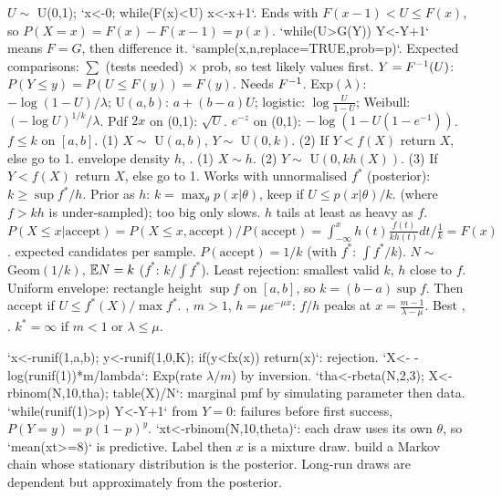 \sk{} $U\sim$ U(0,1); `x<-0; while(F(x)<U) x<-x+1`. Ends with $F(x-1)<U\le F(x)$, so $P(X=x)=F(x)-F(x-1)=p(x)$.  `while(U>G(Y)) Y<-Y+1` means $F=G$, then difference it. `sample(x,n,replace=TRUE,prob=p)`. Expected comparisons: $\sum$ (tests needed) $\times$ prob, so test likely values first.
\sk{} $Y=F^{-1}(U)$: $P(Y\le y)=P(U\le F(y))=F(y)$. Needs $F^{-1}$. Exp$(\lambda)$: $-\log(1-U)/\lambda$; U$(a,b)$: $a+(b-a)U$; logistic: $\log\frac U{1-U}$; Weibull: $(-\log U)^{1/k}/\lambda$. Pdf $2x$ on (0,1): $\sqrt U$. $e^{-z}$ on (0,1): $-\log(1-U(1-e^{-1}))$.
\sk{} $f\le k$ on $[a,b]$. (1) $X\sim$ U$(a,b)$, $Y\sim$ U$(0,k)$. (2) If $Y<f(X)$ return $X$, else go to 1.
\sk{} envelope density $h$, . (1) $X\sim h$. (2) $Y\sim$ U$(0,kh(X))$. (3) If $Y<f(X)$ return $X$, else go to 1. Works with unnormalised $f^*$ (posterior): $k\ge\sup f^*/h$. Prior as $h$: $k=\max_\theta p(x|\theta)$, keep if $U\le p(x|\theta)/k$.  (where $f>kh$ is under-sampled); too big only slows. $h$ tails at least as heavy as $f$.
\sk{} $P(X\le x|\text{accept})=P(X\le x,\text{accept})/P(\text{accept})=\int_{-\infty}^xh(t)\frac{f(t)}{kh(t)}dt\big/\frac1k=F(x)$.
\sk{} expected candidates per sample. $P(\text{accept})=1/k$ (with $f^*$: $\int f^*/k$). $N\sim$ Geom$(1/k)$, $\mathbb{E} N=k$ ($f^*$: $k/\int f^*$). Least rejection: smallest valid $k$, $h$ close to $f$. Uniform envelope: rectangle height $\sup f$ on $[a,b]$, so $k=(b-a)\sup f$. Then accept if $U\le f^*(X)/\max f^*$.
\sk{}, $m>1$, $h=\mu e^{-\mu x}$: $f/h$ peaks at $x=\frac{m-1}{\lambda-\mu}$. Best , . $k^*=\infty$ if $m<1$ or $\lambda\le\mu$.
\bx
{}\par
\li`x<-runif(1,a,b); y<-runif(1,0,K); if(y<fx(x)) return(x)`: rejection.
\li`X<- -log(runif(1))*m/lambda`: Exp(rate $\lambda/m$) by inversion.
\li`tha<-rbeta(N,2,3); X<-rbinom(N,10,tha); table(X)/N`: marginal pmf by simulating parameter then data.
\li`while(runif(1)>p) Y<-Y+1` from $Y=0$: failures before first success, $P(Y=y)=p(1-p)^y$.
\li`xt<-rbinom(N,10,theta)`: each draw uses its own $\theta$, so `mean(xt>=8)` is predictive. Label then $x$ is a mixture draw.
 build a Markov chain whose stationary distribution is the posterior. Long-run draws are dependent but approximately from the posterior.
